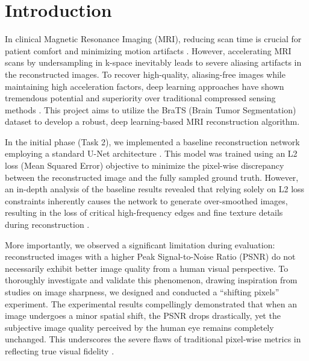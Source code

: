 \section{Introduction}
In clinical Magnetic Resonance Imaging (MRI), reducing scan time is crucial for patient comfort and minimizing motion artifacts \cite{lustig2007sparse}. However, accelerating MRI scans by undersampling in k-space inevitably leads to severe aliasing artifacts in the reconstructed images. To recover high-quality, aliasing-free images while maintaining high acceleration factors, deep learning approaches have shown tremendous potential and superiority over traditional compressed sensing methods \cite{schlemper2017deep, wang2016accelerating}. This project aims to utilize the BraTS (Brain Tumor Segmentation) dataset to develop a robust, deep learning-based MRI reconstruction algorithm.

In the initial phase (Task 2), we implemented a baseline reconstruction network employing a standard U-Net architecture \cite{ronneberger2015u}. This model was trained using an L2 loss (Mean Squared Error) objective to minimize the pixel-wise discrepancy between the reconstructed image and the fully sampled ground truth. However, an in-depth analysis of the baseline results revealed that relying solely on L2 loss constraints inherently causes the network to generate over-smoothed images, resulting in the loss of critical high-frequency edges and fine texture details during reconstruction \cite{johnson2016perceptual}.

More importantly, we observed a significant limitation during evaluation: reconstructed images with a higher Peak Signal-to-Noise Ratio (PSNR) do not necessarily exhibit better image quality from a human visual perspective. To thoroughly investigate and validate this phenomenon, drawing inspiration from studies on image sharpness, we designed and conducted a ``shifting pixels'' experiment. The experimental results compellingly demonstrated that when an image undergoes a minor spatial shift, the PSNR drops drastically, yet the subjective image quality perceived by the human eye remains completely unchanged. This underscores the severe flaws of traditional pixel-wise metrics in reflecting true visual fidelity \cite{ledig2017photo}.

